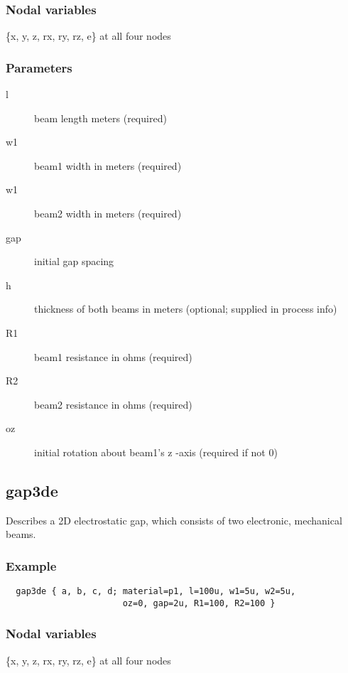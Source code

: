 \subsubsection*{Nodal variables}
\{x, y, z, rx, ry, rz, e\} at all four nodes 
 
\subsubsection*{Parameters}
\begin{description}
 \item[l] beam length meters (required) 
 \item[w1] beam1 width in meters (required) 
 \item[w1] beam2 width in meters (required) 
 \item[gap] initial gap spacing 
 \item[h] thickness of both beams in meters (optional; supplied in process info) 
 \item[R1] beam1 resistance in ohms (required) 
 \item[R2] beam2 resistance in ohms (required) 
 \item[oz] initial rotation about beam1's z -axis (required if not 0) 
\end{description}

\subsection{gap3de}
 
Describes a 2D electrostatic gap, which consists of two electronic, 
mechanical beams. 
 
\subsubsection*{Example}

\begin{verbatim}
  gap3de { a, b, c, d; material=p1, l=100u, w1=5u, w2=5u, 
                       oz=0, gap=2u, R1=100, R2=100 }
\end{verbatim}

\subsubsection*{Nodal variables}

\{x, y, z, rx, ry, rz, e\} at all four nodes 

